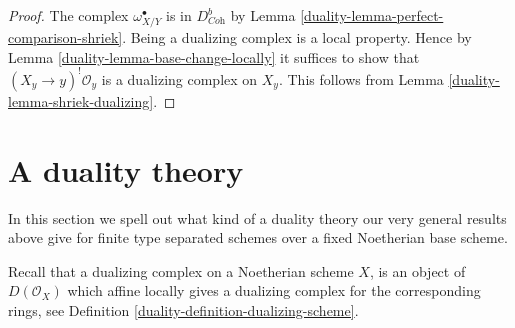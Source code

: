 \begin{proof}

The complex $\omega_{X/Y}^\bullet$ is in $D^b_{\textit{Coh}}$
by Lemma \ref{duality-lemma-perfect-comparison-shriek}.
Being a dualizing complex is a local property.
Hence by Lemma \ref{duality-lemma-base-change-locally}
it suffices to show that $(X_y \to y)^!\mathcal{O}_y$
is a dualizing complex on $X_y$.
This follows from Lemma \ref{duality-lemma-shriek-dualizing}.
\end{proof}

\section{A duality theory}
\label{duality-section-duality}
In this section we spell out what kind of a duality theory our very general
results above give for finite type separated schemes over a fixed
Noetherian base scheme.

\medskip\noindent
Recall that a dualizing complex on a Noetherian scheme $X$, is an
object of $D(\mathcal{O}_X)$ which affine locally gives a dualizing
complex for the corresponding rings, see
Definition \ref{duality-definition-dualizing-scheme}.

